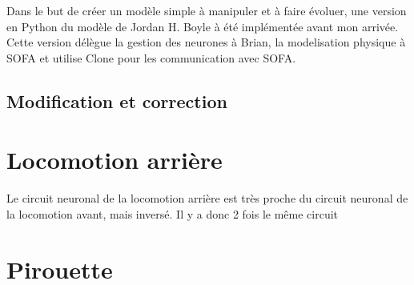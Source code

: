 Dans le but de créer un modèle simple à manipuler et à faire évoluer, une version en Python du
modèle de Jordan H. Boyle à été implémentée avant mon arrivée. Cette version délègue la gestion
des neurones à Brian, la modelisation physique à SOFA et utilise Clone pour les communication
avec SOFA.

\subsection{Modification et correction} %
\label{sub:Modification et correction}



\section{Locomotion arrière} %
\label{sec:Locomotion arrière}

Le circuit neuronal de la locomotion arrière est très proche du circuit neuronal de la locomotion
avant, mais inversé\cite{Boyle2009}. Il y a donc 2 fois le même circuit


\section{Pirouette} %
\label{sec:Pirouette}


